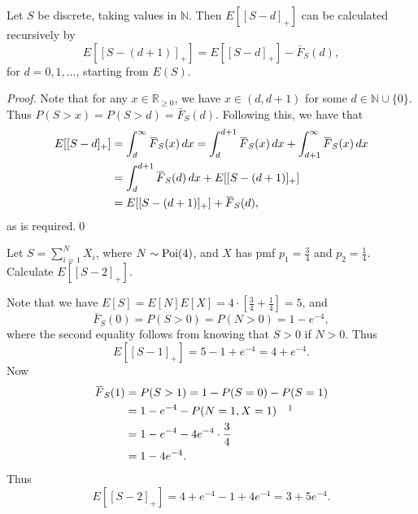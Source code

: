 \documentclass[notoc,notitlepage]{tufte-book}
\begin{document}
\begin{propo}\label{propo:a_recursive_formula_for_the_expected_value_of_a_stop_loss_insurance}
  Let $S$ be discrete, taking values in $\mathbb{N}$. Then $E [ [ S - d ]_+ ]$ can be calculated recursively by
  \begin{equation*}
    E [ [ S - ( d + 1 ) ]_+ ] = E [ [ S - d ]_+ ] - \bar{F}_S(d),
  \end{equation*}
  for $d = 0, 1, \ldots$, starting from $E(S)$.
\end{propo}

\begin{proof}
  Note that for any $x \in \mathbb{R}_{\geq 0}$, we have $x \in (d, d + 1)$ for some $d \in \mathbb{N} \cup \{ 0 \}$. Thus $P ( S > x ) = P ( S > d ) = \bar{F}_S(d)$. Following this, we have that
  \begin{align*}
    E [ [ S - d ]_+ ] &= \int_{d}^{\infty} \bar{F}_S(x) \dif{x} = \int_{d}^{d + 1} \bar{F}_S(x) \dif{x} + \int_{d + 1}^{\infty} \bar{F}_S(x) \dif{x} \\
                      &= \int_{d}^{d + 1} \bar{F}_S(d) \dif{x} + E [ [ S - ( d + 1 ) ]_+ ] \\
                      &= E [ [ S - ( d + 1 ) ]_+ ] + \bar{F}_S(d),
  \end{align*}
  as is required.\qed\
\end{proof}

\begin{eg}
  Let $S = \sum_{i=1}^{N} X_i$, where $N \sim \operatorname{Poi}(4)$, and $X$ has pmf $p_1 = \frac{3}{4}$ and $p_2 = \frac{1}{4}$. Calculate $E [ [ S - 2 ]_+ ]$.
\end{eg}

\begin{solution}
  Note that we have $E[S] = E[N]E[X] = 4 \cdot \left[ \frac{3}{4} + \frac{1}{4} \right] = 5$, and
  \begin{equation*}
    \bar{F}_S(0) = P ( S > 0 ) = P ( N > 0 ) = 1 - e^{-4},
  \end{equation*}
  where the second equality follows from knowing that $S > 0$ if $N > 0$. Thus
  \begin{equation*}
    E [ [ S - 1 ]_+ ] = 5 - 1 + e^{-4}= 4 + e^{-4}.
  \end{equation*}
  Now
  \begin{align*}
    \bar{F}_S(1) &= P( S > 1 )  = 1 - P ( S = 0 ) - P ( S = 1 ) \\
                 &= 1 - e^{-4} - P ( N = 1, X = 1 ) \quad \footnotemark \\
                 &= 1 - e^{-4} - 4e^{-4} \cdot \frac{3}{4} \\
                 &= 1 - 4e^{-4}.
  \end{align*}
   Thus
  \begin{equation*}
    E [ [ S - 2 ]_+ ] = 4 + e^{-4} - 1 + 4 e ^{-4} = 3 + 5 e^{-4}.
  \end{equation*}
\end{solution}
\end{document}
